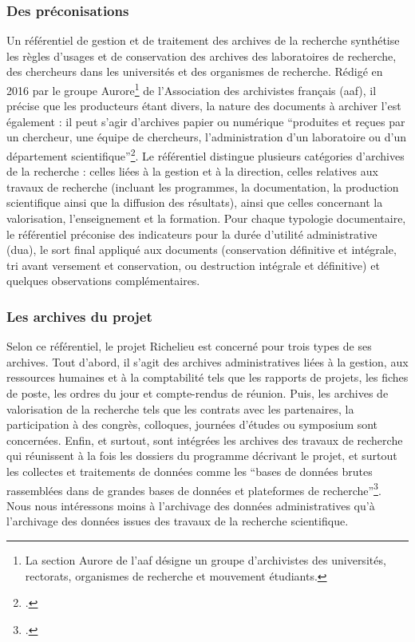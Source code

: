 \subsubsection{Des préconisations}
Un référentiel de gestion et de traitement des archives de la recherche synthétise les règles d'usages et de conservation des archives des laboratoires de recherche, des chercheurs dans les universités et des organismes de recherche.  Rédigé en 2016 par le groupe Aurore\footnote{La section Aurore de l'\acrshort{aaf} désigne un groupe d'archivistes des universités, rectorats, organismes de recherche et mouvement étudiants.} de l'Association des archivistes français (\acrshort{aaf}), il précise que les producteurs étant divers, la nature des documents à archiver l'est également : il peut s'agir d'archives papier ou numérique \enquote{produites et reçues par un chercheur, une équipe de chercheurs, l'administration d'un laboratoire ou d'un département scientifique}\footcite{AUROREReferentiel2016}. Le référentiel distingue plusieurs catégories d'archives de la recherche : celles liées à la gestion et à la direction, celles relatives aux travaux de recherche (incluant les programmes, la documentation, la production scientifique ainsi que la diffusion des résultats), ainsi que celles concernant la valorisation, l'enseignement et la formation. Pour chaque typologie documentaire, le référentiel préconise des indicateurs pour la durée d'utilité administrative (\acrshort{dua}), le sort final appliqué aux documents (conservation définitive et intégrale, tri avant versement et conservation, ou destruction intégrale et définitive) et quelques observations complémentaires. 

\subsubsection{Les archives du projet}
Selon ce référentiel, le projet Richelieu est concerné pour trois types de ses archives. Tout d'abord, il s'agit des archives administratives liées à la gestion, aux ressources humaines et à la comptabilité tels que les rapports de projets, les fiches de poste, les ordres du jour et compte-rendus de réunion. Puis, les archives de valorisation de la recherche tels que les contrats avec les partenaires, la participation à des congrès, colloques, journées d'études ou symposium sont concernées. Enfin, et surtout, sont intégrées les archives des travaux de recherche qui réunissent à la fois les dossiers du programme décrivant le projet, et surtout les collectes et traitements de données comme les \enquote{bases de données brutes rassemblées dans de grandes bases de données et plateformes de recherche}\footcite{AUROREReferentiel2016}. Nous nous intéressons moins à l'archivage des données administratives qu'à l'archivage des données issues des travaux de la recherche scientifique. 

